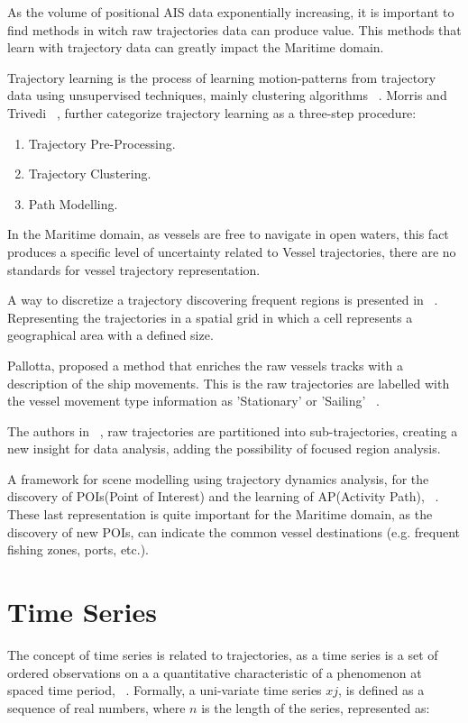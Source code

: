 As the volume of positional AIS data exponentially increasing, it is important to find methods in witch raw trajectories data can produce value. This methods that learn with trajectory data can greatly impact the Maritime domain.

Trajectory learning is the process of learning motion-patterns from trajectory data using unsupervised techniques, mainly clustering algorithms ~\cite{LeGuillarme2013}.
Morris and Trivedi ~\cite{Morris2008}, further categorize trajectory learning as a three-step procedure: 

\begin{enumerate}
\item Trajectory Pre-Processing.
\item Trajectory Clustering. 
\item Path Modelling.
\end{enumerate}

In the Maritime domain, as vessels are free to navigate in open waters, this fact produces a specific level of uncertainty related to Vessel trajectories, there are no standards for vessel trajectory representation.

A way to discretize a trajectory discovering frequent regions is presented in ~\cite{Lei2016}. Representing the trajectories in a spatial grid in which a cell represents a geographical area with a defined size.

Pallotta, proposed a method that enriches the raw vessels tracks with a description of the ship movements. This is the raw trajectories are labelled with the vessel movement type information as 'Stationary' or 'Sailing' ~\cite{Pallotta2013}.

The authors in ~\cite{Lee}, raw trajectories are partitioned into sub-trajectories, creating a new insight for data analysis, adding the possibility of focused region analysis.  

A framework for scene modelling using trajectory dynamics analysis, for the discovery of POIs(Point of Interest) and the learning of AP(Activity Path), ~\cite{Morris2008}. 
These last representation is quite important for the Maritime domain, as the discovery of new POIs, can indicate the common vessel destinations (e.g. frequent fishing zones, ports, etc.).  

\section{Time Series}
\label{section: Time Series}
The concept of time series is related to trajectories, as a time series is a set of ordered observations on a a quantitative characteristic of a
phenomenon at spaced time period, ~\cite{Ivanovic2016b}. Formally, a uni-variate time series $xj$, is defined as a sequence of real numbers, where $n$ is the length of the series, represented as:

